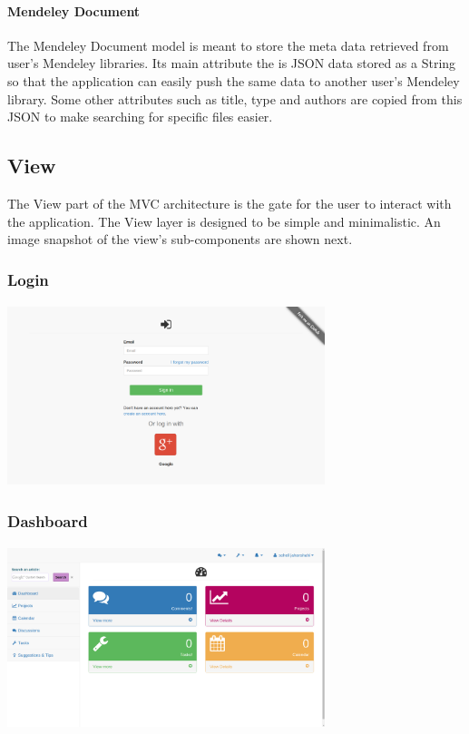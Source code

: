 \paragraph{Mendeley Document} %
The Mendeley Document model is meant to store the meta data retrieved from user's Mendeley libraries. Its main attribute the is JSON data
stored as a String so that the application can easily push the same data to another user's Mendeley library. Some other attributes such as
title, type and authors are copied from this JSON to make searching for specific files easier.

\subsection{View} %
The View part of the MVC architecture is the gate for the user to interact with the application. The View layer is designed to be simple and minimalistic. An image snapshot of the view's sub-components are shown next.
\subsubsection{Login}

\begin{center}
\includegraphics[height=200px, width=350px]{./img/dsgn_img/login.png}
	
\end{center}

\subsubsection{Dashboard}

\begin{center}
\includegraphics[height=200px, width=350px]{./img/dsgn_img/dashboard.png}
	
\end{center}

